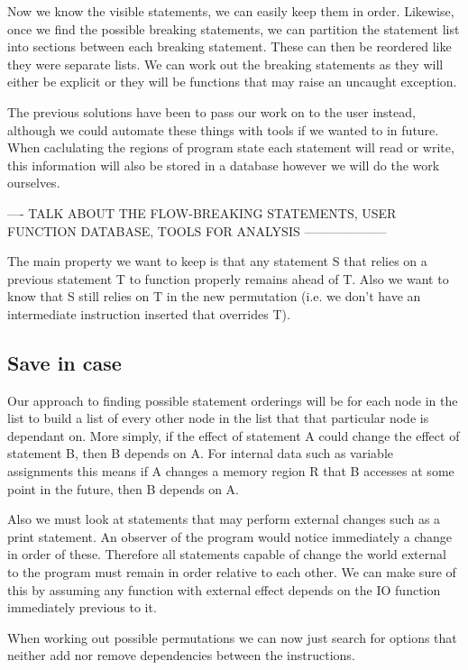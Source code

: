 \documentclass{report}
\begin{document}
Now we know the visible statements, we can easily keep them in order. Likewise, once we find the possible breaking statements, we can partition the statement list
into sections between each breaking statement. These can then be reordered like they were separate lists. We can work out the breaking statements as they will either
be explicit or they will be functions that may raise an uncaught exception.

The previous solutions have been to pass our work on to the user instead, although we could automate these things with tools if we wanted to in future. When caclulating
the regions of program state each statement will read or write, this information will also be stored in a database however we will do the work ourselves.

---- TALK ABOUT THE FLOW-BREAKING STATEMENTS, USER FUNCTION DATABASE, TOOLS FOR ANALYSIS --------------------

The main property we want
to keep is that any statement S that relies on a previous statement T to function properly remains ahead of T. Also we want to know that S still
relies on T in the new permutation (i.e. we don't have an intermediate instruction inserted that overrides T).

\subsection{Save in case}

Our approach to finding possible statement orderings will be for each node in the list to build a list of every other node in the list that that
particular node is dependant on. More simply, if the effect of statement A could change the effect of statement B, then B depends on A. For internal
data such as variable assignments this means if A changes a memory region R that B accesses at some point in the future, then B depends on A.

Also we must look at statements that may perform external changes such as a print statement. An observer of the program would notice immediately
a change in order of these. Therefore all statements capable of change the world external to the program must remain in order relative to each other.
We can make sure of this by assuming any function with external effect depends on the IO function immediately previous to it.

When working out possible permutations we can now just search for options that neither add nor remove dependencies between the instructions.
\end{document}
